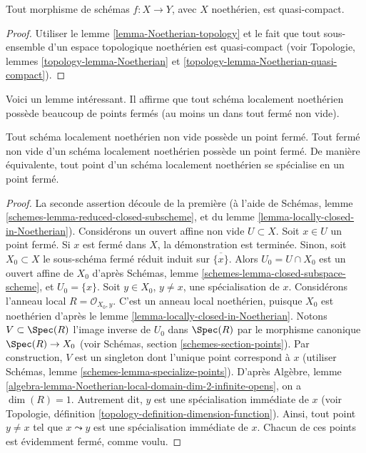 \begin{lemma}
\label{lemma-morphism-Noetherian-schemes-quasi-compact}
Tout morphisme de schémas $f : X \to Y$, avec $X$ noethérien,
est quasi-compact.
\end{lemma}

\begin{proof}
Utiliser le lemme \ref{lemma-Noetherian-topology}
et le fait que tout sous-ensemble d'un espace topologique
noethérien est quasi-compact (voir Topologie,
lemmes \ref{topology-lemma-Noetherian} et
\ref{topology-lemma-Noetherian-quasi-compact}).
\end{proof}

\noindent
Voici un lemme intéressant.
Il affirme que tout schéma localement noethérien possède beaucoup de
points fermés (au moins un dans tout fermé non vide).

\begin{lemma}
\label{lemma-locally-Noetherian-closed-point}
Tout schéma localement noethérien non vide possède un point fermé.
Tout fermé non vide d'un schéma localement noethérien possède un point fermé.
De manière équivalente, tout point d'un schéma localement noethérien se spécialise
en un point fermé.
\end{lemma}

\begin{proof}
La seconde assertion découle de la première (à l'aide de
Schémas, lemme \ref{schemes-lemma-reduced-closed-subscheme},
et du lemme \ref{lemma-locally-closed-in-Noetherian}).
Considérons un ouvert affine non vide $U \subset X$.
Soit $x \in U$ un point fermé. Si $x$ est fermé
dans $X$, la démonstration est terminée. Sinon, soit $X_0 \subset X$ le
sous-schéma fermé réduit induit sur $\overline{\{x\}}$.
Alors $U_0 = U \cap X_0$ est un ouvert affine de $X_0$ d'après
Schémas, lemme \ref{schemes-lemma-closed-subspace-scheme}, et
$U_0 = \{x\}$. Soit $y \in X_0$, $y \not = x$, une spécialisation de $x$.
Considérons l'anneau local $R = \mathcal{O}_{X_0, y}$.
C'est un anneau local noethérien, puisque $X_0$ est noethérien
d'après le lemme \ref{lemma-locally-closed-in-Noetherian}. Notons $V \subset \Spec(R)$
l'image inverse de $U_0$ dans $\Spec(R)$ par le morphisme canonique
$\Spec(R) \to X_0$ (voir Schémas, section \ref{schemes-section-points}).
Par construction, $V$ est un singleton dont l'unique point correspond à $x$ (utiliser
Schémas, lemme \ref{schemes-lemma-specialize-points}).
D'après
Algèbre, lemme \ref{algebra-lemma-Noetherian-local-domain-dim-2-infinite-opens},
on a $\dim(R) = 1$.
Autrement dit, $y$ est une spécialisation immédiate
de $x$ (voir Topologie, définition \ref{topology-definition-dimension-function}).
Ainsi, tout
point $y \not = x$ tel que $x \leadsto y$ est une spécialisation
immédiate de $x$. Chacun de ces points est évidemment
fermé, comme voulu.
\end{proof}

